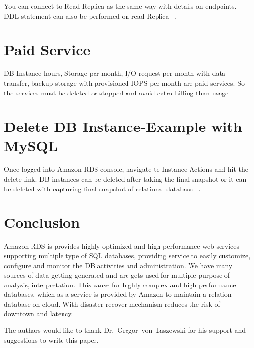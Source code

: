 You can connect to Read Replica as the same way with details on endpoints. 
DDL statement can also be performed on read Replica
~\cite{hid-sp18-520-amazonrdscreatesteps}.

\section{Paid Service}
DB Instance hours, Storage per month, I/O request per month with data transfer, 
backup storage with provisioned IOPS per month are paid services.
So the services must be deleted or stopped and avoid extra billing than usage.
~\cite{hid-sp18-520-amazonrdsfaqs}

\section{Delete DB Instance-Example with MySQL}

Once logged into Amazon RDS console, navigate to Instance Actions 
and hit the delete link.
DB instances can be deleted after taking the final snapshot or it can be 
deleted with capturing final snapshot of relational database
~\cite{hid-sp18-520-amazonrdscreatesteps}.

\section{Conclusion}
Amazon RDS is provides highly optimized and high performance web services
supporting multiple type of SQL databases, providing service to easily 
customize, configure and monitor the DB activities and administration.
We have many sources of data getting generated and are gets used for 
multiple purpose of analysis, interpretation. This cause for highly complex
and high performance databases, which as a service is provided by Amazon to 
maintain a relation database on cloud. With disaster recover mechanism reduces
the risk of downtown and latency.

\begin{acks}
  The authors would like to thank Dr.~Gregor~von~Laszewski for his
  support and suggestions to write this paper.
\end{acks}



 
